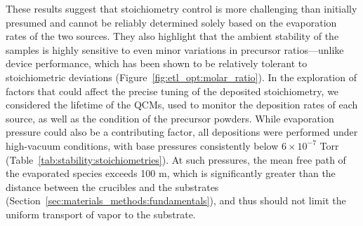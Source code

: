 These results suggest that stoichiometry control is more challenging than initially presumed and cannot be reliably determined solely based on the evaporation rates of the two sources. They also highlight that the ambient stability of the samples is highly sensitive to even minor variations in precursor ratios—unlike device performance, which has been shown to be relatively tolerant to stoichiometric deviations (Figure~\ref{fig:etl_opt:molar_ratio}). In the exploration of factors that could affect the precise tuning of the deposited stoichiometry, we considered the lifetime of the QCMs, used to monitor the deposition rates of each source, as well as the condition of the precursor powders. While evaporation pressure could also be a contributing factor, all depositions were performed under high-vacuum conditions, with base pressures consistently below $6 \times 10^{-7}$ Torr (Table~\ref{tab:stability:stoichiometries}). At such pressures, the mean free path of the evaporated species exceeds 100 m, which is significantly greater than the distance between the crucibles and the substrates (Section~\ref{sec:materials_methods:fundamentals}), and thus should not limit the uniform transport of vapor to the substrate.

